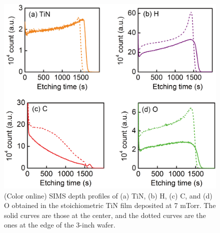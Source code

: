 \begin{figure}
\begin{center}
\includegraphics[width=125mm]{InPlaneDist-SIMS.jpg}
\end{center}
\caption{(Color online) SIMS depth profiles of (a) TiN, (b) H, (c) C, and (d) O obtained in the stoichiometric TiN film deposited at 7 mTorr. The solid curves are those at the center, and the dotted curves are the ones at the edge of the 3-inch wafer.}
\label{InPlaneDist-SIMS}
\end{figure}

